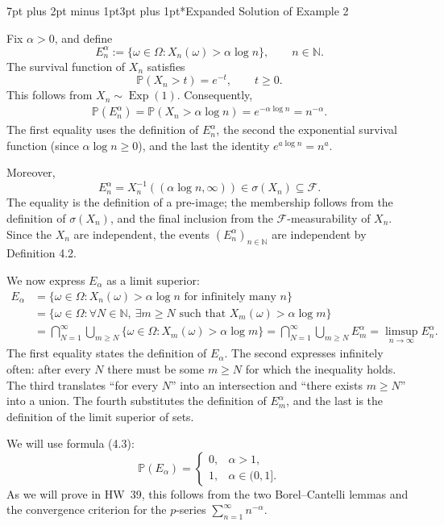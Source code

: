\documentclass[11pt,a4paper]{article}
\makeatletter
\renewcommand{\subsubsection}{\@startsection{subsubsection}{3}{0pt}
  {7pt plus 2pt minus 1pt}{3pt plus 1pt}{\normalfont\normalsize\bfseries\boldmath\color{StudyBlue}}}
\makeatother
\begin{document}
\subsubsection*{Expanded Solution of Example 2}%
%


Fix $\alpha>0$, and define
\[
E_n^\alpha:=\{\omega\in\Omega:X_n(\omega)>\alpha\log n\},
\qquad n\in\mathbb N.
\]
The survival function of $X_n$ satisfies
\[
\mathbb P(X_n>t)=e^{-t},\qquad t\ge0.
\]
This follows from $X_n\sim\operatorname{Exp}(1)$. Consequently,
\[
\begin{aligned}
\mathbb P(E_n^\alpha)
=\mathbb P(X_n>\alpha\log n) =e^{-\alpha\log n} =n^{-\alpha}.
\end{aligned}
\]
The first equality uses the definition of $E_n^\alpha$, the second the exponential survival function (since $\alpha\log n\ge0$), and the last the identity $e^{a\log n}=n^a$.

Moreover,
\[
E_n^\alpha
=X_n^{-1}((\alpha\log n,\infty))
\in\sigma(X_n)\subseteq\mathcal F.
\]
The equality is the definition of a pre-image; the membership follows from the definition of $\sigma(X_n)$, and the final inclusion from the $\mathcal F$-measurability of $X_n$. Since the $X_n$ are independent, the events $(E_n^\alpha)_{n\in\mathbb N}$ are independent by Definition 4.2.

We now express $E_\alpha$ as a limit superior:
\[
\begin{aligned}
E_\alpha
&=\{\omega\in\Omega:X_n(\omega)>\alpha\log n
  \text{ for infinitely many }n\}\\&=\{\omega\in\Omega:\forall N\in\mathbb N,\ \exists m\ge N
  \text{ such that }X_m(\omega)>\alpha\log m\}\\&=\bigcap_{N=1}^{\infty}\bigcup_{m\ge N}
  \{\omega\in\Omega:X_m(\omega)>\alpha\log m\} =\bigcap_{N=1}^{\infty}\bigcup_{m\ge N}E_m^\alpha =\limsup_{n\to\infty}E_n^\alpha.
\end{aligned}
\]
The first equality states the definition of $E_\alpha$. The second expresses infinitely often: after every $N$ there must be some $m\ge N$ for which the inequality holds. The third translates ``for every $N$'' into an intersection and ``there exists $m\ge N$'' into a union. The fourth substitutes the definition of $E_m^\alpha$, and the last is the definition of the limit superior of sets.

We will use formula (4.3):
\[
\mathbb P(E_\alpha)=
\begin{cases}
0,&\alpha>1,\\
1,&\alpha\in(0,1].
\end{cases}
\]
As we will prove in HW~39, this follows from the two Borel--Cantelli lemmas and the convergence criterion for the $p$-series $\sum_{n=1}^{\infty}n^{-\alpha}$.
\end{document}
